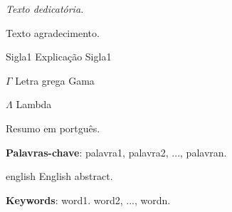  




\frenchspacing 

\imprimircapa

\imprimirfolhaderosto

\begin{dedicatoria}
   \vspace*{\fill}
   \centering
   \noindent
   \textit{ Texto dedicatória.} \vspace*{\fill}
\end{dedicatoria}

\begin{agradecimentos}
Texto agradecimento.
\end{agradecimentos}

\tableofcontents*
\cleardoublepage

\listoffigures*
\cleardoublepage

\listoftables*
\cleardoublepage

\begin{siglas}
  \item[Sigla1] Explicação Sigla1
\end{siglas}

\begin{simbolos}
  \item[$ \Gamma $] Letra grega Gama
  \item[$ \Lambda $] Lambda
\end{simbolos}


\setlength{\absparsep}{18pt} %
\begin{resumo}
 Resumo em portguês.

\textbf{Palavras-chave}: palavra1, palavra2, ..., palavran.
\end{resumo}

\begin{resumo}[Abstract]
    \begin{otherlanguage*}{english}
        English abstract.
        
        \vspace{\onelineskip}
        
        \noindent 
        \textbf{Keywords}: word1. word2, ..., wordn.
    \end{otherlanguage*}
\end{resumo}

